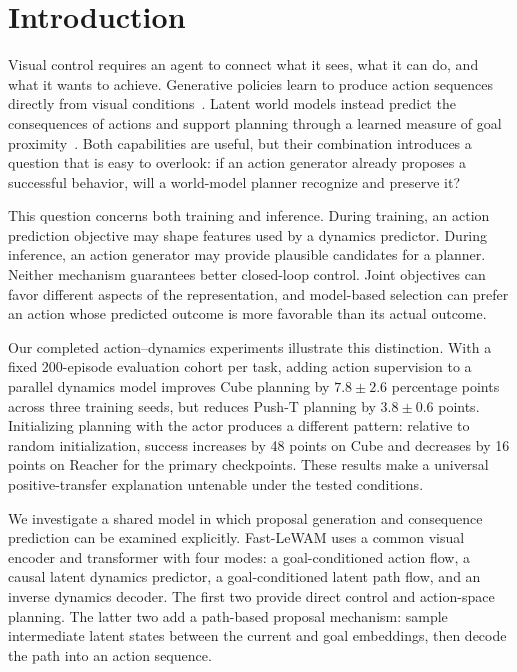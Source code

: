 \section{Introduction}
\label{sec:introduction}

Visual control requires an agent to connect what it sees, what it can do, and what it wants to achieve. Generative policies learn to produce action sequences directly from visual conditions~\cite{chi2023diffusion}. Latent world models instead predict the consequences of actions and support planning through a learned measure of goal proximity~\cite{zhou2024dinowm,maes2026lewm}. Both capabilities are useful, but their combination introduces a question that is easy to overlook: if an action generator already proposes a successful behavior, will a world-model planner recognize and preserve it?

This question concerns both training and inference. During training, an action prediction objective may shape features used by a dynamics predictor. During inference, an action generator may provide plausible candidates for a planner. Neither mechanism guarantees better closed-loop control. Joint objectives can favor different aspects of the representation, and model-based selection can prefer an action whose predicted outcome is more favorable than its actual outcome.

Our completed action--dynamics experiments illustrate this distinction. With a fixed 200-episode evaluation cohort per task, adding action supervision to a parallel dynamics model improves Cube planning by $7.8\pm2.6$ percentage points across three training seeds, but reduces Push-T planning by $3.8\pm0.6$ points. Initializing planning with the actor produces a different pattern: relative to random initialization, success increases by 48 points on Cube and decreases by 16 points on Reacher for the primary checkpoints. These results make a universal positive-transfer explanation untenable under the tested conditions.

We investigate a shared model in which proposal generation and consequence prediction can be examined explicitly. Fast-LeWAM uses a common visual encoder and transformer with four modes: a goal-conditioned action flow, a causal latent dynamics predictor, a goal-conditioned latent path flow, and an inverse dynamics decoder. The first two provide direct control and action-space planning. The latter two add a path-based proposal mechanism: sample intermediate latent states between the current and goal embeddings, then decode the path into an action sequence.

